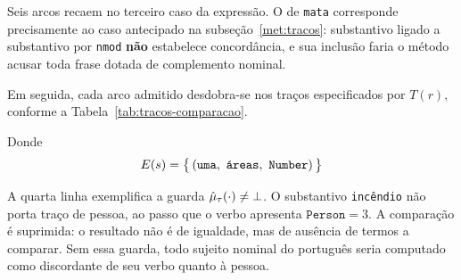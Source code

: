 Seis arcos recaem no terceiro caso da expressão. O de \texttt{mata} corresponde precisamente
ao caso antecipado na subseção~\ref{met:tracos}: substantivo ligado a substantivo por
\texttt{nmod} \textbf{não} estabelece concordância, e sua inclusão faria o método acusar toda
frase dotada de complemento nominal.

Em seguida, cada arco admitido desdobra-se nos traços especificados por $T(r)$, conforme a
Tabela~\ref{tab:tracos-comparacao}.

\begin{table}[H]
\centering
{}
\caption{As comparações efetuadas sobre os quatro arcos admitidos.}
\label{tab:tracos-comparacao}
\end{table}

Donde
%
\begin{equation}
E(s) = \bigl\{\, (\texttt{uma},\ \texttt{áreas},\ \texttt{Number}) \,\bigr\}
\end{equation}

A quarta linha exemplifica a guarda $\hat\mu_{\tau}(\cdot) \neq \bot$. O substantivo
\texttt{incêndio} não porta traço de pessoa, ao passo que o verbo apresenta
$\texttt{Person} = 3$. A comparação é suprimida: o resultado não é de igualdade, mas de
ausência de termos a comparar. Sem essa guarda, todo sujeito nominal do português seria
computado como discordante de seu verbo quanto à pessoa.

